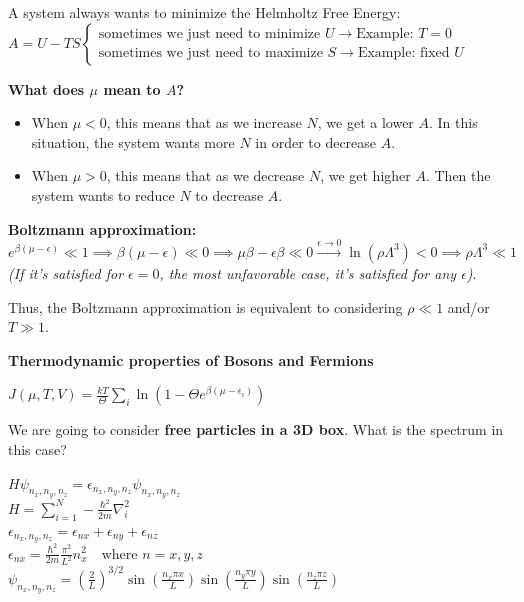 \documentclass[12pt,a4paper]{report}
\newcommand{\esp}{\vspace{0.5cm}}
\begin{document}
	\esp
	
	A system always wants to minimize the Helmholtz Free Energy:
	$A = U - TS \begin{cases} \text{sometimes we just need to minimize } U \to \text{Example: } T=0 \\ \text{sometimes we just need to maximize } S \to \text{Example: fixed } U \end{cases}$
	
	\esp
	
	\textbf{What does $\mu$ mean to $A$?}
	
	\esp
	
	\begin{itemize}
		\item When $\mu < 0$, this means that as we increase $N$, we get a lower $A$. In this situation, the system wants more $N$ in order to decrease $A$.
		\item When $\mu > 0$, this means that as we decrease $N$, we get higher $A$. Then the system wants to reduce $N$ to decrease $A$.
	\end{itemize}
	
	\esp
	
	
	\esp
	
	\textbf{Boltzmann approximation:}
	$e^{\beta(\mu - \epsilon)} \ll 1 \implies \beta(\mu - \epsilon) \ll 0 \implies \mu\beta - \epsilon\beta \ll 0 \xrightarrow{\epsilon \to 0} \ln(\rho \Lambda^3) < 0 \implies \rho \Lambda^3 \ll 1$
	\textit{(If it's satisfied for $\epsilon=0$, the most unfavorable case, it's satisfied for any $\epsilon$)}.
	
	\esp
	
	Thus, the Boltzmann approximation is equivalent to considering $\rho \ll 1$ and/or $T \gg 1$.
	
	\esp
	
	\textbf{Thermodynamic properties of Bosons and Fermions}
	
	\esp
	
	$J(\mu, T, V) = \frac{kT}{\Theta} \sum_i \ln(1 - \Theta e^{\beta(\mu - \epsilon_i)})$
	
	\esp
	
	We are going to consider \textbf{free particles in a 3D box}. What is the spectrum in this case?
	
	\esp
	
	$H \psi_{n_x, n_y, n_z} = \epsilon_{n_x, n_y, n_z} \psi_{n_x, n_y, n_z}$ \\
	$H = \sum_{i=1}^N -\frac{\hbar^2}{2m} \nabla_i^2$ \\
	$\epsilon_{n_x, n_y, n_z} = \epsilon_{nx} + \epsilon_{ny} + \epsilon_{nz}$ \\
	$\epsilon_{nx} = \frac{\hbar^2}{2m} \frac{\pi^2}{L^2} n_x^2 \quad \text{where } n = x, y, z$ \\
	$\psi_{n_x, n_y, n_z} = \left( \frac{2}{L} \right)^{3/2} \sin\left( \frac{n_x \pi x}{L} \right) \sin\left( \frac{n_y \pi y}{L} \right) \sin\left( \frac{n_z \pi z}{L} \right)$
	
\end{document}
